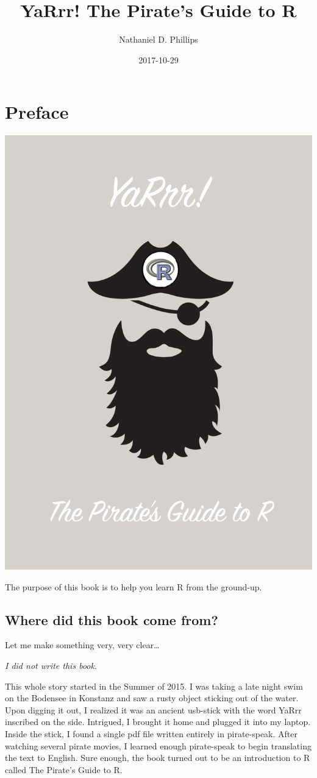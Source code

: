 \documentclass[]{book}
\title{YaRrr! The Pirate's Guide to R}
\author{Nathaniel D. Phillips}
\date{2017-10-29}
\theoremstyle{definition}
\theoremstyle{definition}
\theoremstyle{remark}
\begin{document}
\maketitle

{
\setcounter{tocdepth}{1}
\tableofcontents
}
\chapter{Preface}\label{intro}

\begin{center}\includegraphics[width=0.75\linewidth]{images/YaRrr_Cover} \end{center}

The purpose of this book is to help you learn R from the ground-up.

\section{Where did this book come
from?}\label{where-did-this-book-come-from}

Let me make something very, very clear\ldots{}

\emph{I did not write this book}.

This whole story started in the Summer of 2015. I was taking a late
night swim on the Bodensee in Konstanz and saw a rusty object sticking
out of the water. Upon digging it out, I realized it was an ancient
usb-stick with the word YaRrr inscribed on the side. Intrigued, I
brought it home and plugged it into my laptop. Inside the stick, I found
a single pdf file written entirely in pirate-speak. After watching
several pirate movies, I learned enough pirate-speak to begin
translating the text to English. Sure enough, the book turned out to be
an introduction to R called The Pirate's Guide to R.
\end{document}
